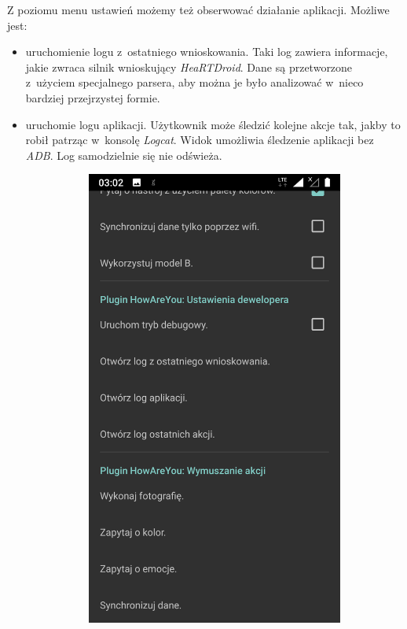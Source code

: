 Z poziomu menu ustawień możemy też obserwować działanie aplikacji. Możliwe jest:

\begin{itemize}
	\item uruchomienie logu z~ostatniego wnioskowania. Taki log zawiera informacje, jakie zwraca silnik wnioskujący \textit{HeaRTDroid}. Dane są przetworzone z~użyciem specjalnego parsera, aby można je było analizować w~nieco bardziej przejrzystej formie.
	
	\item uruchomie logu aplikacji. Użytkownik może śledzić kolejne akcje tak, jakby to robił patrząc w~konsolę \textit{Logcat}. Widok umożliwia śledzenie aplikacji bez \textit{ADB}. Log samodzielnie się nie odświeża.
	
	\begin{figure}[H]
		\centering
		\begin{subfigure}{0.35\textwidth}
			\centering
			\includegraphics[scale=0.13]{rozdzial3/Ustawienia_cz2.png}

\end{subfigure}
\end{figure}
\end{itemize}
